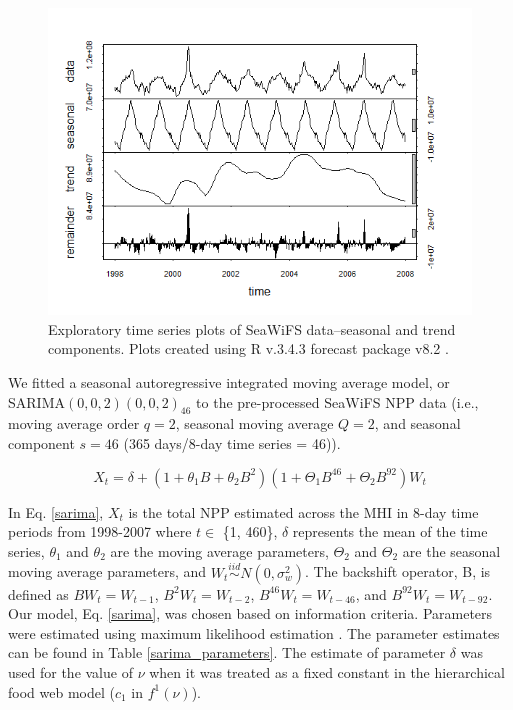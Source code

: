 \documentclass[oneside,12pt,final]{sty/ucthesis-CA2012}
\let\cite\citep                             %
\begin{document}
\begin{mainmatter}
\begin{figure}[H]
     \centering
       \includegraphics[width=.7\textwidth]{fig/seawifs_periodic}
    \caption{Exploratory time series plots of SeaWiFS data--seasonal and trend components. Plots created using R v.3.4.3 \cite{Rcite} forecast package v8.2 \cite{forecast1, forecast2}.}
    \label{A2:SeaWiFSeda3}
\end{figure}

We fitted a seasonal autoregressive integrated moving average model, or \\ SARIMA$(0,0,2)(0,0,2)_{46}$ to the pre-processed SeaWiFS NPP data (i.e., moving average order $q = 2$, seasonal moving average $Q = 2$, and seasonal component $s = 46$ (365 days/8-day time series = 46)).

\begin{equation} \label{sarima}
X_t = \delta + (1 + \theta_1B + \theta_2B^2)(1 + \Theta_1B^{46} + \Theta_2B^{92})W_t
\end{equation}

In Eq. \ref{sarima}, $X_t$ is the total NPP estimated across the MHI in 8-day time periods from 1998-2007 where $t \in$ \{1, 460\}, $\delta$ represents the mean of the time series, $\theta_1$ and $\theta_2$ are the moving average parameters, $\Theta_2$ and $\Theta_2$ are the seasonal moving average parameters, and $W_t \stackrel{iid}{\sim} N(0,\sigma_w^2)$. The backshift operator, B, is defined as $ BW_t  = W_{t-1}$, $B^2W_t  = W_{t-2}$, $B^{46}W_t  = W_{t-46}$, and $B^{92}W_t  = W_{t-92}$.  Our model, Eq. \ref{sarima}, was chosen based on information criteria. Parameters were estimated using maximum likelihood estimation \cite{forecast1, forecast2}. The parameter estimates can be found in Table \ref{sarima_parameters}. The estimate of parameter $\delta$ was used for the value of $\nu$ when it was treated as a fixed constant in the hierarchical food web model ($c_1$ in $f^1(\nu)$).


\end{mainmatter}
\end{document}
